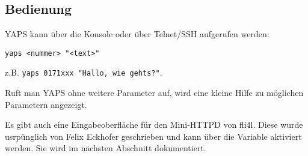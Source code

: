 \subsection {Bedienung}

YAPS kann über die Konsole oder über Telnet/SSH aufgerufen werden:
\begin{small}
\begin{example}
\begin{verbatim}
yaps <nummer> "<text>"
\end{verbatim}
\end{example}
\end{small}

z.B. \verb|yaps 0171xxx "Hallo, wie gehts?"|.

Ruft man YAPS ohne weitere Parameter auf, wird eine kleine Hilfe zu möglichen
Parametern angezeigt.

Es gibt auch eine Eingabeoberfläche für den Mini-HTTPD von fli4l. Diese wurde
usrpünglich von Felix Eckhofer geschrieben und kann über die Variable
 aktiviert werden. Sie wird im nächsten Abschnitt dokumentiert.
